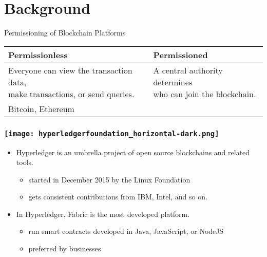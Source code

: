 \documentclass[xcolor=svgnames]{beamer}
\begin{document}
\section{Background}
\begin{frame}{Permissioning of Blockchain Platforms}

\begin{table}
\small
\renewcommand*{\arraystretch}{2}
\begin{tabular}{ll}
Permissionless                                                              & Permissioned                                                \\ \hline
\makecell[l]{Everyone can view the transaction data, \\make transactions, or send queries.} & \makecell[l]{A central authority determines \\who can join the blockchain.} \\
Bitcoin, Ethereum                                                           & \onslide<2->{Hyperledger Fabric}                                          \\
\end{tabular}
\end{table}

\end{frame}

\begin{frame}
\frametitle{
\texttt{[image: hyperledgerfoundation\_horizontal-dark.png]}
\qquad
{}
}

\begin{itemize}
\item Hyperledger is an umbrella project of open source blockchains and related tools.
\begin{itemize}
\item started in December 2015 by the Linux Foundation
\item gets consistent contributions from IBM, Intel, and so on.
\end{itemize}

\item<2-> In Hyperledger, Fabric is the most developed platform.
\begin{itemize}
\item run smart contracts developed in Java, JavaScript, or NodeJS
\item preferred by businesses
\end{itemize}
\end{itemize}
\end{frame}
\end{document}
